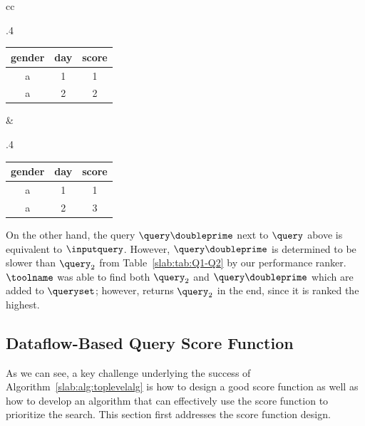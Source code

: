 \begin{example}
\begin{table}[H]
\footnotesize
\begin{tabular}{cc}
\begin{subtable}{.4\linewidth}
\begin{tabular}{|c|c|c|}
 \hline
        gender & day & score \\
        \hline
        a & 1 & 1 \\
        a & 2 & 2 \\
        \hline
\end{tabular}
\end{subtable}
&
\begin{subtable}{.4\linewidth}
\begin{tabular}{|c|c|c|}
 \hline
        gender & day & score \\
        \hline
        a & 1 & 1 \\
        a & 2 & 3 \\
        \hline
\end{tabular}
\end{subtable}
\end{tabular}

\vspace{-5pt}
\label{slab:tab:alg:counterexample}
\end{table}



On the other hand, the query $\query\doubleprime$ next to $\query$ above is equivalent to $\inputquery$. However, $\query\doubleprime$ is determined to be slower than $\query_2$ from Table~\ref{slab:tab:Q1-Q2} by our performance ranker. 
$\toolname$ was able to find both $\query_2$ and $\query\doubleprime$ which are added to $\queryset$; however, \toolname returns $\query_2$ in the end, since it is ranked the highest. 


\label{slab:ex:cegis}
\end{example}


\subsection{Dataflow-Based Query Score Function}
\label{slab:sec:scorefunction}

As we can see, a key challenge underlying the success of Algorithm~\ref{slab:alg:toplevelalg} is how to design a good score function as well as how to develop an algorithm that can effectively use the score function to prioritize the search. 
This section first addresses the score function design. 


